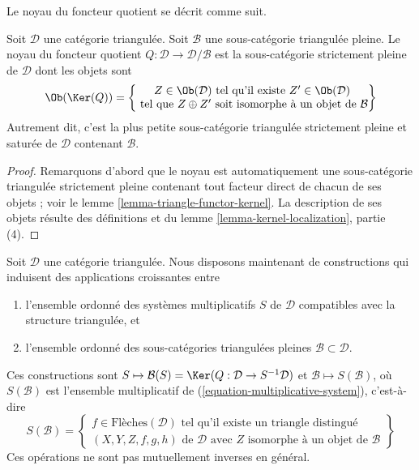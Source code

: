 \noindent
Le noyau du foncteur quotient se décrit comme suit.

\begin{lemma}
\label{lemma-kernel-quotient}
Soit $\mathcal{D}$ une catégorie triangulée.
Soit $\mathcal{B}$ une sous-catégorie triangulée pleine.
Le noyau du foncteur quotient $Q : \mathcal{D} \to \mathcal{D}/\mathcal{B}$ est
la sous-catégorie strictement pleine de $\mathcal{D}$ dont les objets sont
$$
\Ob(\Ker(Q)) =
\left\{
\begin{matrix}
Z \in \Ob(\mathcal{D})
\text{ tel qu'il existe }Z' \in \Ob(\mathcal{D}) \\
\text{ tel que }Z \oplus Z'\text{ soit isomorphe à un objet de }\mathcal{B}
\end{matrix}
\right\}
$$
Autrement dit, c'est la plus petite sous-catégorie triangulée strictement
pleine et saturée de $\mathcal{D}$ contenant $\mathcal{B}$.
\end{lemma}

\begin{proof}
Remarquons d'abord que le noyau est automatiquement une sous-catégorie
triangulée strictement pleine contenant tout facteur direct de chacun de ses
objets ; voir le lemme \ref{lemma-triangle-functor-kernel}.
La description de ses objets résulte des définitions et du
lemme \ref{lemma-kernel-localization}, partie (4).
\end{proof}

\noindent
Soit $\mathcal{D}$ une catégorie triangulée.
Nous disposons maintenant de constructions qui induisent des applications
croissantes entre
\begin{enumerate}
\item l'ensemble ordonné des systèmes multiplicatifs $S$ de $\mathcal{D}$
compatibles avec la structure triangulée, et
\item l'ensemble ordonné des sous-catégories triangulées pleines
$\mathcal{B} \subset \mathcal{D}$.
\end{enumerate}
Ces constructions sont
$S \mapsto \mathcal{B}(S) = \Ker(Q : \mathcal{D} \to S^{-1}\mathcal{D})$ et
$\mathcal{B} \mapsto S(\mathcal{B})$, où $S(\mathcal{B})$ est l'ensemble
multiplicatif de (\ref{equation-multiplicative-system}), c'est-à-dire
$$
S(\mathcal{B}) =
\left\{
\begin{matrix}
f \in \text{Flèches}(\mathcal{D})
\text{ tel qu'il existe un triangle distingué }\\
(X, Y, Z, f, g, h) \text{ de }\mathcal{D}\text{ avec }
Z\text{ isomorphe à un objet de }\mathcal{B}
\end{matrix}
\right\}
$$
Ces opérations ne sont pas mutuellement inverses en général.

